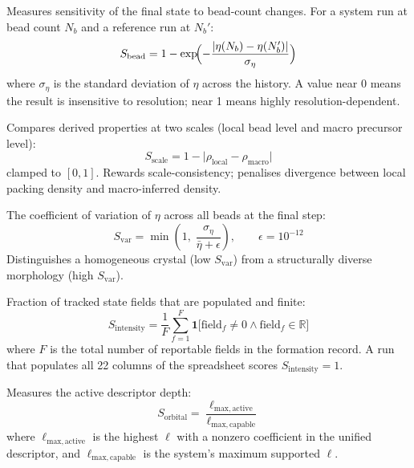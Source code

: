 \documentclass[11pt]{article}
\newcommand{\var}[1]{\ensuremath{\mathrm{#1}}}
\newcommand{\svar}[1]{\ensuremath{S_{\mathrm{#1}}}}
\begin{document}
\begin{description}[style=nextline,noitemsep]
  \item[$\svar{bead}$: Bead Resolution Response]
    Measures sensitivity of the final state to bead-count changes.
    For a system run at bead count $N_b$ and a reference run at $N_b'$:
    \begin{equation}
      \svar{bead} = 1 - \exp\!\Bigl(-\frac{|\eta(N_b) - \eta(N_b')|}{
                          \sigma_\eta}\Bigr)
    \end{equation}
    where $\sigma_\eta$ is the standard deviation of $\eta$ across the
    history.  A value near 0 means the result is insensitive to resolution;
    near 1 means highly resolution-dependent.

  \item[$\svar{scale}$: Multi-Scale Consistency]
    Compares derived properties at two scales (local bead level and
    macro precursor level):
    \begin{equation}
      \svar{scale} = 1 - \bigl|\rho_\var{local} - \rho_\var{macro}\bigr|
    \end{equation}
    clamped to $[0,1]$.  Rewards scale-consistency; penalises divergence
    between local packing density and macro-inferred density.

  \item[$\svar{var}$: Configurational Spread]
    The coefficient of variation of $\eta$ across all beads at the final step:
    \begin{equation}
      \svar{var} = \min\!\left(1,\;
        \frac{\sigma_\eta}{\bar{\eta}+\epsilon}\right),
      \qquad \epsilon = 10^{-12}
    \end{equation}
    Distinguishes a homogeneous crystal (low $\svar{var}$) from a
    structurally diverse morphology (high $\svar{var}$).

  \item[$\svar{intensity}$: Informational Density]
    Fraction of tracked state fields that are populated and finite:
    \begin{equation}
      \svar{intensity} = \frac{1}{F} \sum_{f=1}^{F}
        \mathbf{1}\!\bigl[\text{field}_f \neq 0 \wedge
                          \text{field}_f \in \mathbb{R}\bigr]
    \end{equation}
    where $F$ is the total number of reportable fields in the formation
    record.  A run that populates all 22 columns of the spreadsheet
    scores $\svar{intensity} = 1$.

  \item[$\svar{orbital}$: Orbital Augmentation Richness]
    Measures the active descriptor depth:
    \begin{equation}
      \svar{orbital} = \frac{\ell_\mathrm{max,active}}
                            {\ell_\mathrm{max,capable}}
    \end{equation}
    where $\ell_\mathrm{max,active}$ is the highest $\ell$ with a nonzero
    coefficient in the unified descriptor, and $\ell_\mathrm{max,capable}$
    is the system's maximum supported $\ell$.
\end{description}
\end{document}
